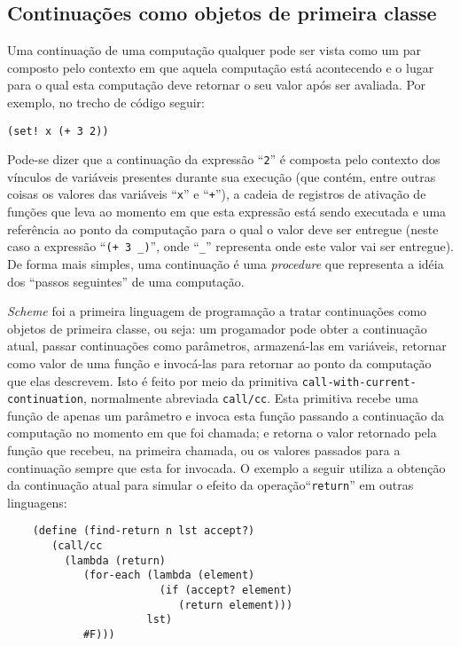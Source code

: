 \subsection{Continuações como objetos de primeira classe}
\label{ss:continuacoes}

Uma continuação de uma computação qualquer pode ser vista como um par composto
pelo contexto em que aquela computação está acontecendo e o lugar para o qual
esta computação deve retornar o seu valor após ser avaliada. Por exemplo, no
trecho de código seguir:

\begin{lstlisting}
(set! x (+ 3 2))

\end{lstlisting}

Pode-se dizer que a continuação da expressão ``\texttt{2}'' é composta pelo
contexto dos vínculos de variáveis presentes durante sua execução (que contém,
entre outras coisas os valores das variáveis ``\texttt{x}'' e ``\texttt{+}''),
a cadeia de registros de ativação de funções que leva ao momento em que esta
expressão está sendo executada e uma referência ao ponto da computação para o
qual o valor deve ser entregue (neste caso a expressão ``\texttt{(+ 3 \_)}'',
onde ``\texttt{\_}'' representa onde este valor vai ser entregue). De forma
mais simples, uma continuação é uma \textit{procedure} que representa a idéia
dos ``passos seguintes'' de uma computação.

\textit{Scheme} foi a primeira linguagem de programação a tratar continuações
como objetos de primeira classe, ou seja: um progamador pode obter a
continuação atual, passar continuações como parâmetros, armazená-las em
variáveis, retornar como valor de uma função e invocá-las para retornar ao
ponto da computação que elas descrevem. Isto é feito por meio da primitiva
\texttt{call-with-current-continuation}, normalmente abreviada
\texttt{call/cc}.  Esta primitiva recebe uma função de apenas um parâmetro e
invoca esta função passando a continuação da computação no momento em que foi
chamada; e retorna o valor retornado pela função que recebeu, na primeira
chamada, ou os valores passados para a continuação sempre que esta for
invocada. O exemplo a seguir utiliza a obtenção da continuação atual para
simular o efeito da operação``\texttt{return}'' em outras linguagens:

\begin{lstlisting}
    (define (find-return n lst accept?)
       (call/cc 
         (lambda (return)
            (for-each (lambda (element)
                        (if (accept? element)
                           (return element)))
                      lst)
            #F)))
\end{lstlisting}

